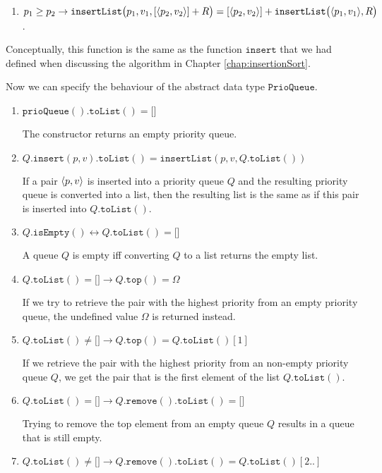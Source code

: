 \begin{Definition}
\begin{enumerate}
\begin{enumerate}
\begin{enumerate}
            \item $p_1 \geq p_2 \rightarrow \texttt{insertList}\bigl(p_1,v_1,[\pair(p_2,v_2)] + R\bigr) = [\pair(p_2,v_2)] + \texttt{insertList}\bigl(\pair(p_1,v_1), R\bigr)$.
            \end{enumerate}
            Conceptually, this function is the same as the function $\mathtt{insert}$ that we had defined when
            discussing the algorithm  in Chapter \ref{chap:insertionSort}.
      \end{enumerate}
      Now we can specify the behaviour of the abstract data type $\texttt{PrioQueue}$.
      \begin{enumerate}
      \item $\texttt{prioQueue}().\texttt{toList}() = \texttt{[]}$

            The constructor returns an empty priority queue.
      \item $Q.\texttt{insert}(p,v).\texttt{toList}() = \texttt{insertList}(p,v,Q.\texttt{toList}())$

            If a pair $\pair(p,v)$ is inserted into a priority queue $Q$ and the resulting priority queue is
            converted into a list, then the resulting list is the same as if this pair is inserted
            into $Q.\texttt{toList}()$.
      \item $Q.\texttt{isEmpty}() \leftrightarrow Q.\texttt{toList}() = \texttt{[]}$

            A queue $Q$ is empty iff converting $Q$ to a list returns the empty list.
      \item $Q.\texttt{toList}() = \texttt{[]} \rightarrow Q.\texttt{top}() = \Omega$

            If we try to retrieve the pair with the highest priority from an empty priority queue, the
            undefined value $\Omega$ is returned instead.
      \item $Q.\texttt{toList}() \not= \texttt{[]} \rightarrow Q.\texttt{top}() = Q.\texttt{toList}()[1]$

            If we retrieve the  pair with the highest priority from an non-empty priority queue $Q$,
            we get the pair that is the first element of the list $Q.\texttt{toList}()$.

      \item $Q.\texttt{toList}() = \texttt{[]} \rightarrow Q.\texttt{remove}().\texttt{toList}() = \texttt{[]}$

            Trying to remove the top element from an empty queue $Q$ results in a queue that is still empty.
      \item $Q.\texttt{toList}() \not= \texttt{[]} \rightarrow Q.\texttt{remove}().\texttt{toList}() =
        Q.\texttt{toList}()[2..]$


\end{enumerate}
\end{enumerate}
\end{Definition}
